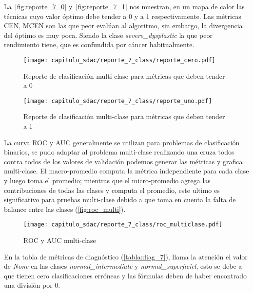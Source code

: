 La~\autoref{fig:reporte_7_0} y~\autoref{fig:reporte_7_1} nos muestran, en un
mapa de calor las técnicas cuyo valor óptimo debe tender a 0 y a 1
respectivamente. Las métricas CEN, MCEN son las que peor evalúan al algoritmo,
sin embargo, la divergencia del óptimo es muy poca. Siendo la clase
\emph{severe\_dysplastic} la que peor rendimiento tiene, que es confundida por
cáncer habitualmente.

\begin{figure}[]
    \centering
    \texttt{[image: capitulo\_sdac/reporte\_7\_class/reporte\_cero.pdf]}
    \caption{Reporte de clasificación multi-clase para métricas que deben tender a 0}\label{fig:reporte_7_0}
\end{figure}

\begin{figure}[]
    \centering
    \texttt{[image: capitulo\_sdac/reporte\_7\_class/reporte\_uno.pdf]}
    \caption{Reporte de clasificación multi-clase para métricas que deben tender a 1}\label{fig:reporte_7_1}
\end{figure}

La curva ROC y AUC generalmente se utilizan para problemas de clasificación
binarios, se pudo adaptar al problema multi-clase  realizando una cruza todos
contra todos de los valores de validación podemos generar las métricas y grafica
multi-clase. El macro-promedio computa la métrica independiente para cada clase
y luego toma el promedio; mientras que el micro-promedio agrega las
contribuciones de todas las clases y computa el promedio, este ultimo es
significativo para pruebas multi-clase debido a que toma en cuenta la falta de
balance entre las clases (\autoref{fig:roc_multi}).

\begin{figure}[H]
    \centering
    \texttt{[image: capitulo\_sdac/reporte\_7\_class/roc\_multiclase.pdf]}
    \caption{ROC y AUC multi-clase}\label{fig:roc_multi}
\end{figure} 

En la tabla de métricas de diagnóstico (\autoref{tabla:diag_7}), llama la
atención el valor de \emph{None} en las clases \emph{normal\_intermediate} y
\emph{normal\_superficiel}, esto se debe a que tienen cero clasificaciones
erróneas y las fórmulas deben de haber encontrado una división por 0. 

